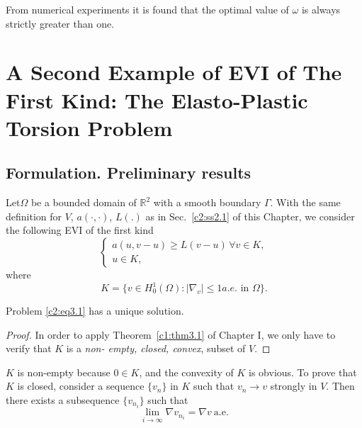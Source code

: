 \begin{remark}\label{c2:rem2.7}%
From numerical experiments it is found that the optimal value of
$\omega$ is always strictly greater than one. 
\end{remark}

\section[A Second Example of EVI of The...]{A Second Example of EVI of
  The First Kind: The   Elasto-Plastic Torsion
  Problem}\label{c2:s3}%

\subsection{Formulation. Preliminary results}\label{c2:ss3.1}%

Let\pageoriginale  $\Omega$ be a bounded domain of $\mathbb{R}^2$ with
a smooth 
boundary $\Gamma$. With the same definition for $V$, $a(\cdot ,
\cdot)$, $L(.)$ 
as in Sec.~\ref{c2:ss2.1} of this Chapter, we consider the following
EVI of the 
first kind 
\begin{equation}
\begin{cases}
a(u, v-u) \geq L(v - u)\, \forall  v \in K,\\
u \in K,\tag{3.1}\label{c2:eq3.1}
\end{cases}
\end{equation}
where 
\begin{equation}
K = \{v \in H^1_0 (\Omega) : | \nabla _v | \leq 1
a.e. \text{ in } \Omega \}. \tag{3.2}\label{c2:eq3.2} 
\end{equation}

\begin{theorem}\label{c2:thm3.1}%
Problem \eqref{c2:eq3.1} has a unique solution.
\end{theorem}

\begin{proof}
In order to apply Theorem~\ref{c1:thm3.1} of Chapter I, we only have
to verify that $K$ is a {\em non- empty, closed, convex}, subset of
$V$.  
\end{proof}

$K$ is non-empty because $0 \in K$, and the convexity of $K$ is
obvious. To prove that $K$ is closed, consider a sequence $\{v_n \}$
in $K$ such that $v_n \to v$ strongly in $V$. Then there exists a
subsequence $\{v_{n_i}\}$ such that  
$$
\lim_{i \to \infty} \nabla v_{n_i} = \nabla v~\text{a.e.} 
$$

